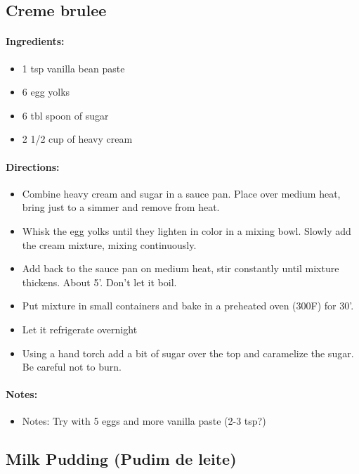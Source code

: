\documentclass{article}
\begin{document}
\subsection{Creme brulee}

\paragraph{Ingredients:}
\begin{itemize}
    \item 1 tsp vanilla bean paste
    \item 6 egg yolks
    \item 6 tbl spoon of sugar
    \item 2 1/2 cup of heavy cream
\end{itemize}

\paragraph{Directions:}
\begin{itemize}
    \item Combine heavy cream and sugar in a sauce pan. Place over medium heat, bring just to a simmer and remove from heat.
    \item Whisk the egg yolks until they lighten in color in a mixing bowl. Slowly add the cream mixture, mixing continuously.
    \item Add back to the sauce pan on medium heat, stir constantly until mixture thickens. About 5'. Don't let it boil.
    \item Put mixture in small containers and bake in a preheated oven (300F) for 30'.
    \item Let it refrigerate overnight
    \item Using a hand torch add a bit of sugar over the top and caramelize the sugar. Be careful not to burn.
\end{itemize}

\paragraph{Notes:}
\begin{itemize}
    \item Notes: Try with 5 eggs and more vanilla paste (2-3 tsp?)
\end{itemize}

\subsection{Milk Pudding (Pudim de leite)}
\end{document}
